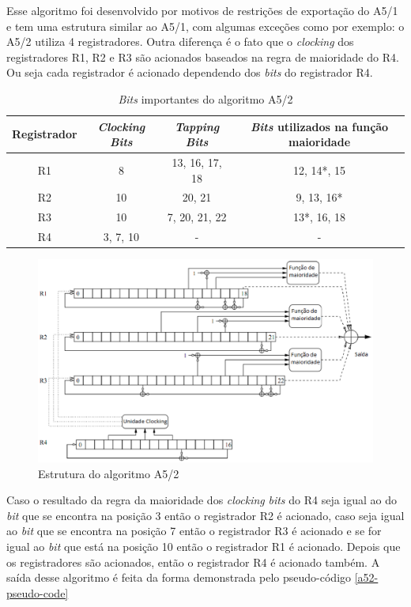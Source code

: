 Esse algoritmo foi desenvolvido por motivos de restrições de exportação do A5/1 e tem uma estrutura similar ao A5/1, com algumas exceções como por exemplo: o A5/2 utiliza 4 registradores. Outra diferença é o fato que o \textit{clocking} dos registradores R1, R2 e R3 são acionados baseados na regra de maioridade do R4. Ou seja cada registrador é acionado dependendo dos \textit{bits} do registrador R4. 

\begin{table}[h]
\centering
	\begin{tabular}{|c|c|c|c|}
		\hline
		Registrador & \textit{Clocking Bits} & \textit{Tapping Bits} & \textit{Bits} utilizados na função maioridade \\ \hline
		R1 & 8 & 13, 16, 17, 18  & 12, 14*\protect\footnotemark , 15\\ \hline
		R2 & 10 & 20, 21 & 9, 13, 16*\\ \hline
		R3 & 10 & 7, 20, 21, 22 & 13*, 16, 18\\ \hline	
		R4 & 3, 7, 10 & - & -\\ \hline
	\end{tabular}
	\caption{\textit{Bits} importantes do algoritmo A5/2}
\end{table}
\begin{figure}[h]
\centering
\includegraphics[keepaspectratio=true,scale=0.5]
    {figuras/a5_2.eps}
    \caption[Estrutura do algoritmo A5/2]{Estrutura do algoritmo A5/2\protect\footnotemark } 
\end{figure}

Caso o resultado da regra da maioridade dos \textit{clocking} \textit{bits} do R4 seja igual ao do \textit{bit} que se encontra na posição 3 então o registrador R2 é acionado, caso seja igual ao \textit{bit} que se encontra na posição 7 então o registrador R3 é acionado e se for igual ao \textit{bit} que está na posição 10 então o registrador R1 é acionado. Depois que os registradores são acionados, então o registrador R4 é acionado também. A saída desse algoritmo é feita da forma demonstrada pelo pseudo-código \ref{a52-pseudo-code}

